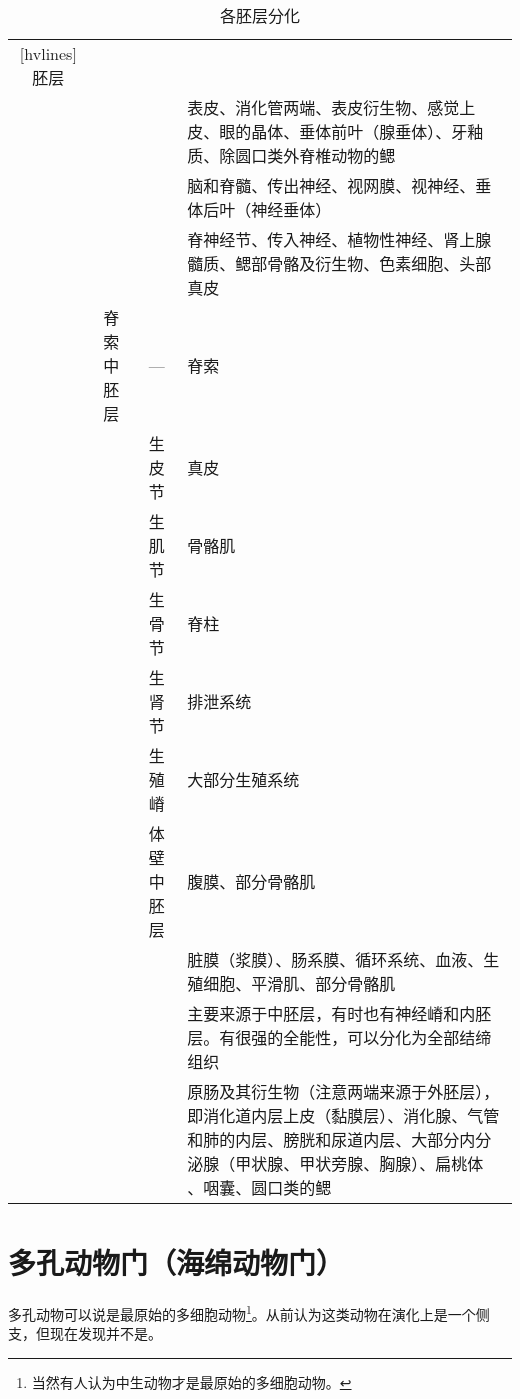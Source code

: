 \begin{table}[htbp]
	\centering
	\begin{NiceTabularX}{\textwidth}{cccX}[hvlines]
		胚层 &  &  &  \\
		 &  &  & 表皮、消化管两端、表皮衍生物、感觉上皮、眼的晶体、垂体前叶（腺垂体）、牙釉质、除圆口类外脊椎动物的鳃 \\
		&  &  & 脑和脊髓、传出神经、视网膜、视神经、垂体后叶（神经垂体） \\
		&  &  & 脊神经节、传入神经、植物性神经、肾上腺髓质、鳃部骨骼及衍生物、色素细胞、头部真皮 \\
		 & 脊索中胚层 & --- & 脊索 \\
		&  & 生皮节 & 真皮 \\
		&  & 生肌节 & 骨骼肌 \\
		&  & 生骨节 & 脊柱 \\
		&  & 生肾节 & 排泄系统 \\
		& & 生殖嵴 & 大部分生殖系统\\
		&  & 体壁中胚层 & 腹膜、部分骨骼肌 \\
		&  &  & 脏膜（浆膜）、肠系膜、循环系统、血液、生殖细胞、平滑肌、部分骨骼肌 \\
		&  &  & 主要来源于中胚层，有时也有神经嵴和内胚层。有很强的全能性，可以分化为全部结缔组织 \\
		 &  &  & 原肠及其衍生物（注意两端来源于外胚层），即消化道内层上皮（黏膜层）、消化腺、气管和肺的内层、膀胱和尿道内层、大部分内分泌腺（甲状腺、甲状旁腺、胸腺）、扁桃体 、咽囊、圆口类的鳃 \\
	\end{NiceTabularX}
	\caption{各胚层分化}
	\label{tab:germLayerDifferentiation}
\end{table}

\section[多孔动物门]{多孔动物门（海绵动物门）}

多孔动物可以说是最原始的多细胞动物\footnote{当然有人认为中生动物才是最原始的多细胞动物。}。从前认为这类动物在演化上是一个侧支，但现在发现并不是。

